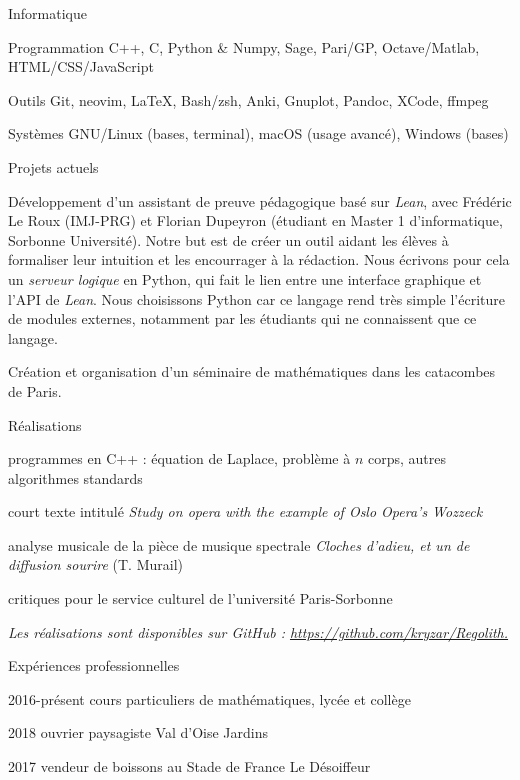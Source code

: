 \documentclass{LoLaTeXcv}
\begin{document}
\begin{lltxHistory}{Informatique}
\item[Programmation]C++, C, Python \& Numpy, Sage, Pari/GP, Octave/Matlab, HTML/CSS/JavaScript
	\item[Outils]Git, neovim, \LaTeX, Bash/zsh, Anki, Gnuplot, Pandoc, XCode, ffmpeg
	\item[Systèmes]GNU/Linux (bases, terminal), macOS (usage avancé), Windows (bases)
\end{lltxHistory}


\begin{lltxItemize}{Projets actuels}
	\item Développement d'un assistant de preuve pédagogique basé sur \textit{Lean}, avec Frédéric Le Roux (IMJ-PRG) et Florian Dupeyron (étudiant en Master 1 d'informatique, Sorbonne Université). Notre but est de créer un outil aidant les élèves à formaliser leur intuition et les encourrager à la rédaction. Nous écrivons pour cela un \textit{serveur logique} en Python, qui fait le lien entre une interface graphique et l'API de \textit{Lean}. Nous choisissons Python car ce langage rend très simple l'écriture de modules externes, notamment par les étudiants qui ne connaissent que ce langage.
	\item Création et organisation d'un séminaire de mathématiques dans les catacombes de Paris.
\end{lltxItemize}

\begin{lltxItemize}{Réalisations}
	\item programmes en C++ : équation de Laplace, problème à $n$ corps, autres algorithmes standards
	\item court texte intitulé \textit{Study on opera with the example of Oslo Opera's Wozzeck}
	\item analyse musicale de la pièce de musique spectrale \textit{Cloches d'adieu, et un de diffusion sourire} (T. Murail)
	\item critiques pour le service culturel de l'université Paris-Sorbonne
\end{lltxItemize}

\vspace{1em}
\textit{Les réalisations sont disponibles sur GitHub : \url{https://github.com/kryzar/Regolith.}}

\begin{lltxHistory}{Expériences professionnelles}
	\item[2016-présent] cours particuliers de mathématiques, lycée et collège 
	\item[2018] ouvrier paysagiste \lltxdotfill Val d'Oise Jardins
	\item[2017] vendeur de boissons au Stade de France \lltxdotfill Le Désoiffeur
\end{lltxHistory}
\end{document}
